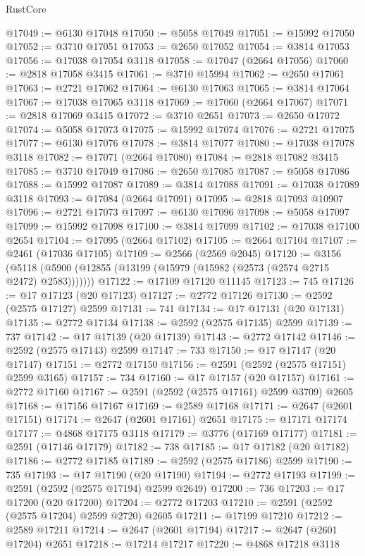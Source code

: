\begin{lexlean}{RustCore}
\begin{coremodule}
@17049 := @6130 @17048
@17050 := @5058 @17049
@17051 := @15992 @17050
@17052 := @3710 @17051
@17053 := @2650 @17052
@17054 := @3814 @17053
@17056 := @17038 @17054 @3118
@17058 := @17047 (@2664 @17056)
@17060 := @2818 @17058 @3415
@17061 := @3710 @15994
@17062 := @2650 @17061
@17063 := @2721 @17062
@17064 := @6130 @17063
@17065 := @3814 @17064
@17067 := @17038 @17065 @3118
@17069 := @17060 (@2664 @17067)
@17071 := @2818 @17069 @3415
@17072 := @3710 @2651
@17073 := @2650 @17072
@17074 := @5058 @17073
@17075 := @15992 @17074
@17076 := @2721 @17075
@17077 := @6130 @17076
@17078 := @3814 @17077
@17080 := @17038 @17078 @3118
@17082 := @17071 (@2664 @17080)
@17084 := @2818 @17082 @3415
@17085 := @3710 @17049
@17086 := @2650 @17085
@17087 := @5058 @17086
@17088 := @15992 @17087
@17089 := @3814 @17088
@17091 := @17038 @17089 @3118
@17093 := @17084 (@2664 @17091)
@17095 := @2818 @17093 @10907
@17096 := @2721 @17073
@17097 := @6130 @17096
@17098 := @5058 @17097
@17099 := @15992 @17098
@17100 := @3814 @17099
@17102 := @17038 @17100 @2654
@17104 := @17095 (@2664 @17102)
@17105 := @2664 @17104
@17107 := @2461 (@17036 @17105)
@17109 := @2566 (@2569 @2045)
@17120 := @3156
    (@5118 (@5900 (@12855 (@13199 (@15979 (@15982 (@2573 (@2574 @2715 @2472) @2583)))))))
@17122 := @17109 @17120 @11145
@17123 := 745
@17126 := @17 @17123 (@20 @17123)
@17127 := @2772 @17126
@17130 := @2592 (@2575 @17127) @2599
@17131 := 741
@17134 := @17 @17131 (@20 @17131)
@17135 := @2772 @17134
@17138 := @2592 (@2575 @17135) @2599
@17139 := 737
@17142 := @17 @17139 (@20 @17139)
@17143 := @2772 @17142
@17146 := @2592 (@2575 @17143) @2599
@17147 := 733
@17150 := @17 @17147 (@20 @17147)
@17151 := @2772 @17150
@17156 := @2591 (@2592 (@2575 @17151) @2599 @3165)
@17157 := 734
@17160 := @17 @17157 (@20 @17157)
@17161 := @2772 @17160
@17167 := @2591 (@2592 (@2575 @17161) @2599 @3709) @2605
@17168 := @17156 @17167
@17169 := @2589 @17168
@17171 := @2647 (@2601 @17151)
@17174 := @2647 (@2601 @17161) @2651
@17175 := @17171 @17174
@17177 := @4868 @17175 @3118
@17179 := @3776 (@17169 @17177)
@17181 := @2591 (@17146 @17179)
@17182 := 738
@17185 := @17 @17182 (@20 @17182)
@17186 := @2772 @17185
@17189 := @2592 (@2575 @17186) @2599
@17190 := 735
@17193 := @17 @17190 (@20 @17190)
@17194 := @2772 @17193
@17199 := @2591 (@2592 (@2575 @17194) @2599 @2649)
@17200 := 736
@17203 := @17 @17200 (@20 @17200)
@17204 := @2772 @17203
@17210 := @2591 (@2592 (@2575 @17204) @2599 @2720) @2605
@17211 := @17199 @17210
@17212 := @2589 @17211
@17214 := @2647 (@2601 @17194)
@17217 := @2647 (@2601 @17204) @2651
@17218 := @17214 @17217
@17220 := @4868 @17218 @3118

\end{coremodule}
\end{lexlean}
